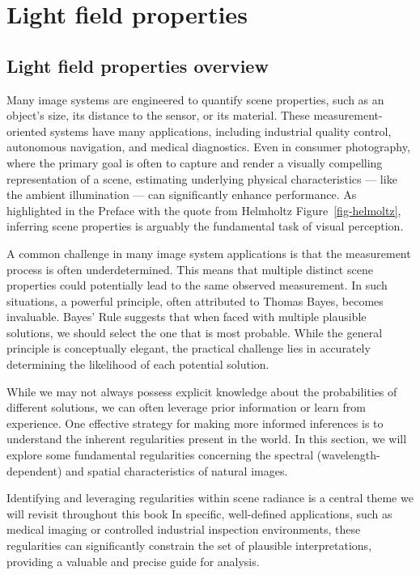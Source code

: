 \documentclass[
  letterpaper,
]{book}
\begin{document}
\chapter{Light field properties}\label{sec-lightfield-properties}

\section{Light field properties
overview}\label{sec-lightfield-properties-overview}

Many image systems are engineered to quantify scene properties, such as
an object's size, its distance to the sensor, or its material. These
measurement-oriented systems have many applications, including
industrial quality control, autonomous navigation, and medical
diagnostics. Even in consumer photography, where the primary goal is
often to capture and render a visually compelling representation of a
scene, estimating underlying physical characteristics --- like the
ambient illumination --- can significantly enhance performance. As
highlighted in the Preface with the quote from Helmholtz
Figure~\ref{fig-helmoltz}, inferring scene properties is arguably the
fundamental task of visual perception.

A common challenge in many image system applications is that the
measurement process is often underdetermined. This means that multiple
distinct scene properties could potentially lead to the same observed
measurement. In such situations, a powerful principle, often attributed
to Thomas Bayes, becomes invaluable. Bayes' Rule suggests that when
faced with multiple plausible solutions, we should select the one that
is most probable. While the general principle is conceptually elegant,
the practical challenge lies in accurately determining the likelihood of
each potential solution.

While we may not always possess explicit knowledge about the
probabilities of different solutions, we can often leverage prior
information or learn from experience. One effective strategy for making
more informed inferences is to understand the inherent regularities
present in the world. In this section, we will explore some fundamental
regularities concerning the spectral (wavelength-dependent) and spatial
characteristics of natural images.

Identifying and leveraging regularities within scene radiance is a
central theme we will revisit throughout this book In specific,
well-defined applications, such as medical imaging or controlled
industrial inspection environments, these regularities can significantly
constrain the set of plausible interpretations, providing a valuable and
precise guide for analysis.
\end{document}
